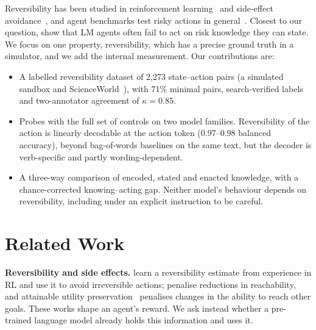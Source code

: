 \documentclass[conference]{IEEEtran}
\begin{document}
Reversibility has been studied in reinforcement learning~\cite{grinsztajn2021turning} and side-effect avoidance~\cite{krakovna2018side,turner2020aup}, and agent benchmarks test risky actions in general~\cite{ruan2024toolemu,yin2024safeagentbench}. Closest to our question, \cite{tang2025risk} show that LM agents often fail to act on risk knowledge they can state. We focus on one property, reversibility, which has a precise ground truth in a simulator, and we add the internal measurement. Our contributions are:
\begin{itemize}
\item A labelled reversibility dataset of 2{,}273 state--action pairs (a simulated sandbox and ScienceWorld~\cite{wang2022scienceworld}), with 71\% minimal pairs, search-verified labels and two-annotator agreement of $\kappa=0.85$.
\item Probes with the full set of controls on two model families. Reversibility of the action is linearly decodable at the action token (0.97--0.98 balanced accuracy), beyond bag-of-words baselines on the same text, but the decoder is verb-specific and partly wording-dependent.
\item A three-way comparison of encoded, stated and enacted knowledge, with a chance-corrected knowing--acting gap. Neither model's behaviour depends on reversibility, including under an explicit instruction to be careful.
\end{itemize}

\section{Related Work}
\textbf{Reversibility and side effects.} \cite{grinsztajn2021turning} learn a reversibility estimate from experience in RL and use it to avoid irreversible actions; \cite{krakovna2018side} penalise reductions in reachability, and attainable utility preservation~\cite{turner2020aup} penalises changes in the ability to reach other goals. These works shape an agent's reward. We ask instead whether a pre-trained language model already holds this information and uses it.
\end{document}
